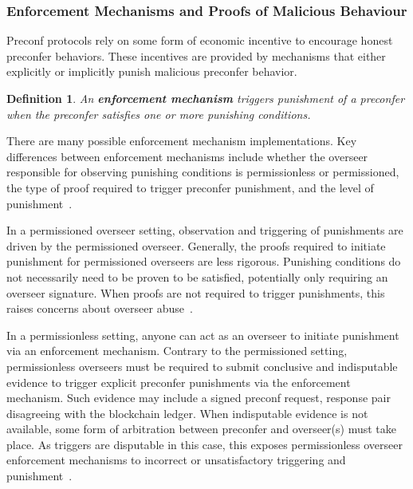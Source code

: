 \documentclass[a4paper]{article}
\theoremstyle{boldstyle}
\newtheorem{definitionx}{Definition}
\newenvironment{definition}
  {\begin{defopenboxq}\begin{definitionx}}
  {\end{definitionx}\end{defopenboxq}}
\begin{document}
\subsubsection{Enforcement Mechanisms and Proofs of Malicious Behaviour}
\label{sec:enforcement}

    Preconf protocols rely on some form of economic incentive to encourage honest preconfer behaviors. These incentives are provided by mechanisms that either explicitly or implicitly punish malicious preconfer behavior. 
    \begin{definition}
    \label{def:enforcement}
        An \textbf{enforcement mechanism} 
        triggers punishment of a preconfer when the preconfer satisfies one or more punishing conditions. 
    \end{definition}


    There are many possible enforcement mechanism implementations. Key differences between enforcement mechanisms include whether the overseer responsible for observing punishing conditions is permissionless or permissioned, the type of proof required to trigger preconfer punishment, and the level of punishment~\cite{W:PreconfirmationFairExchange}.

    In a permissioned overseer setting, observation and triggering of punishments are driven by the permissioned overseer. Generally, the proofs required to initiate punishment for permissioned overseers are less rigorous.  Punishing conditions do not necessarily need to be proven to be satisfied, potentially only requiring an overseer signature. When proofs are not required to trigger punishments, this raises concerns about overseer abuse~\cite{W:PreconfirmationFairExchange}.

    In a permissionless setting, anyone can act as an overseer to initiate punishment via an enforcement mechanism. Contrary to the permissioned setting, permissionless overseers must be required to submit conclusive and indisputable evidence to trigger explicit preconfer punishments via the enforcement mechanism. Such evidence may include a signed preconf request, response pair disagreeing with the blockchain ledger. When indisputable evidence is not available, some form of arbitration between preconfer and overseer(s) must take place. As triggers are disputable in this case, this exposes permissionless overseer enforcement mechanisms to incorrect or unsatisfactory triggering and punishment~\cite{W:GitHub-UniversalRegistryContract,W:GitHub-ExampleSlasherImplementations,W:PreconfirmationFairExchange}. 
    
\end{document}
